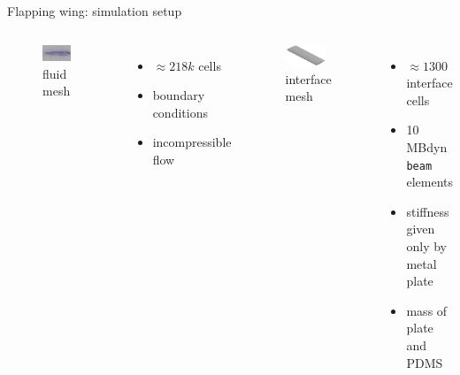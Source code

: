 \documentclass[10pt,t]{beamer}
\begin{document}
\begin{frame}{Flapping wing: simulation setup}
    \begin{columns}
        \begin{figure}
	    \centering
	        \includegraphics[width=0.8\textwidth]{images/heathcote/dom02.png}
	        \caption{fluid mesh}
        \end{figure}
        \vspace{0.25cm}
        \footnotesize
        \begin{itemize}
            \item $\approx 218k$ cells
            \item boundary conditions
            \item incompressible flow
        \end{itemize}

        \begin{figure}
	    \centering
	        \includegraphics[width=0.875\textwidth]{images/heathcote/interface01b.png}
	        \caption{interface mesh}
        \end{figure}
        \vspace{0.25cm}
        \footnotesize
        \begin{itemize}
            \item $\approx 1300$ interface cells
            \item 10 MBdyn \texttt{beam} elements
            \item stiffness given only by metal plate
            \item mass of plate and PDMS
        \end{itemize}
\end{columns}

\end{frame}
\end{document}

